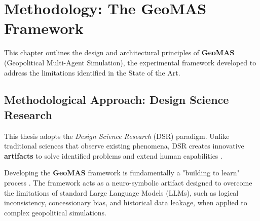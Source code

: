 \chapter{Methodology: The GeoMAS Framework}
\label{chap:methodology}

This chapter outlines the design and architectural principles of \textbf{GeoMAS} (Geopolitical Multi-Agent Simulation), the experimental framework developed to address the limitations identified in the State of the Art. 

\section{Methodological Approach: Design Science Research}
\label{sec:design_science}
This thesis adopts the \textit{Design Science Research} (DSR) paradigm. Unlike traditional sciences that observe existing phenomena, DSR creates innovative \textbf{artifacts} to solve identified problems and extend human capabilities \cite{hevner2004design}. 

Developing the \textbf{GeoMAS} framework is fundamentally a "building to learn" process \cite{simon2019sciences}. The framework acts as a neuro-symbolic artifact designed to overcome the limitations of standard Large Language Models (LLMs), such as logical inconsistency, concessionary bias, and historical data leakage, when applied to complex geopolitical simulations.


